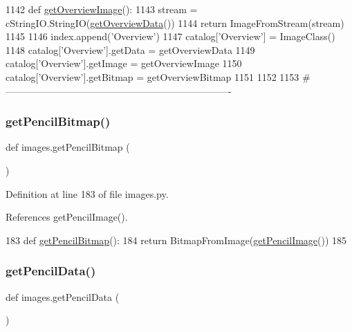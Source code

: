 \begin{DoxyCode}
1142 \textcolor{keyword}{def }\hyperlink{namespaceimages_a3f687e69d4a1d3e3557513c673a4a91c}{getOverviewImage}():
1143     stream = cStringIO.StringIO(\hyperlink{namespaceimages_ac431d64f5cb525f4d569389b880983b9}{getOverviewData}())
1144     \textcolor{keywordflow}{return} ImageFromStream(stream)
1145 
1146 index.append(\textcolor{stringliteral}{'Overview'})
1147 catalog[\textcolor{stringliteral}{'Overview'}] = ImageClass()
1148 catalog[\textcolor{stringliteral}{'Overview'}].getData = getOverviewData
1149 catalog[\textcolor{stringliteral}{'Overview'}].getImage = getOverviewImage
1150 catalog[\textcolor{stringliteral}{'Overview'}].getBitmap = getOverviewBitmap
1151 
1152 
1153 \textcolor{comment}{#----------------------------------------------------------------------}
\end{DoxyCode}
\mbox{\label{namespaceimages_ac5d1d4cd99b3fdfe8e4dd3d52b393aed}} 
\subsubsection{\texorpdfstring{get\+Pencil\+Bitmap()}{getPencilBitmap()}}
{\footnotesize\ttfamily def images.\+get\+Pencil\+Bitmap (\begin{DoxyParamCaption}{ }\end{DoxyParamCaption})}



Definition at line 183 of file images.\+py.



References get\+Pencil\+Image().


\begin{DoxyCode}
183 \textcolor{keyword}{def }\hyperlink{namespaceimages_ac5d1d4cd99b3fdfe8e4dd3d52b393aed}{getPencilBitmap}():
184     \textcolor{keywordflow}{return} BitmapFromImage(\hyperlink{namespaceimages_a695877c0a720a45d82a271c8fdeb1887}{getPencilImage}())
185 
\end{DoxyCode}
\mbox{\label{namespaceimages_a5d8df1140a3cfdc7bd201547c9bba93d}} 
\subsubsection{\texorpdfstring{get\+Pencil\+Data()}{getPencilData()}}
{\footnotesize\ttfamily def images.\+get\+Pencil\+Data (\begin{DoxyParamCaption}{ }\end{DoxyParamCaption})}



